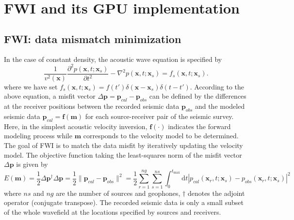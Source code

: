 \section{FWI and its GPU implementation}

\subsection{FWI: data mismatch minimization}

In the case of constant density, the acoustic wave equation is specified by
\begin{equation}\label{eq:acoustic}
\frac{1}{v^2(\textbf{x})}\frac{\partial^2 p(\textbf{x},t;\textbf{x}_s)}{\partial t^2}-\nabla^2 p(\textbf{x},t;\textbf{x}_s)=f_s(\textbf{x},t;\textbf{x}_s).
\end{equation}
where we have set $ f_s(\textbf{x},t;\textbf{x}_s)=f(t')\delta(\textbf{x}-\textbf{x}_s)\delta(t-t')$. 
According to the above equation, a misfit vector  $\Delta \textbf{p}=\textbf{p}_{cal}-\textbf{p}_{obs}$ can be defined by the differences at the receiver positions between the recorded seismic data $\textbf{p}_{obs}$ and the modeled seismic data $\textbf{p}_{cal}=\textbf{f}(\textbf{m})$ for each source-receiver pair of the seismic survey. Here, in the simplest acoustic velocity inversion, $\textbf{f}(\cdot)$ indicates the forward modeling process while $\textbf{m}$ corresponds to the velocity model to be determined. The goal of FWI is to match the data misfit by iteratively updating the velocity model. The objective function taking the least-squares norm of the misfit vector $\Delta \textbf{p}$ is given by
\begin{equation}\label{eq:obj}
E(\textbf{m})=\frac{1}{2}\Delta \textbf{p}^{\dagger}\Delta \textbf{p}
=\frac{1}{2}\|\textbf{p}_{cal}-\textbf{p}_{obs}\|^2
=\frac{1}{2}\sum_{r=1}^{ng}\sum_{s=1}^{ns}\int_{0}^{t_{\max}}\mathrm{d}t|p_{cal}(\textbf{x}_r, t;\textbf{x}_s)-p_{obs}(\textbf{x}_r, t;\textbf{x}_s)|^2
\end{equation}
where $ns$ and $ng$ are the number of sources and geophones, $\dagger$ denotes the adjoint operator (conjugate transpose). The recorded seismic data is only a small subset of the whole wavefield at the locations specified by sources and receivers.

